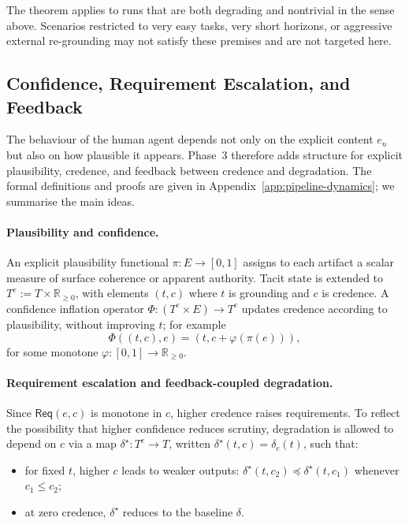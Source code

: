 \documentclass[11pt]{article}
\theoremstyle{definition}
\newcommand{\Req}{\mathsf{Req}}
\begin{document}
The theorem applies to runs that are both degrading and nontrivial in
the sense above. Scenarios restricted to very easy tasks, very short
horizons, or aggressive external re-grounding may not satisfy these
premises and are not targeted here.

\subsection{Confidence, Requirement Escalation, and Feedback}

The behaviour of the human agent depends not only on the explicit
content \(e_n\) but also on how plausible it appears. Phase~3 therefore
adds structure for explicit plausibility, credence, and feedback between
credence and degradation. The formal definitions and proofs are given in
Appendix~\ref{app:pipeline-dynamics}; we summarise the main ideas.

\paragraph{Plausibility and confidence.}
An explicit plausibility functional \(\pi:E\to[0,1]\) assigns to each
artifact a scalar measure of surface coherence or apparent authority.
Tacit state is extended to \(T^e:=T\times\mathbb{R}_{\ge 0}\), with
elements \((t,c)\) where \(t\) is grounding and \(c\) is credence. A
confidence inflation operator
\(\Phi:(T^e\times E)\to T^e\) updates credence according to plausibility,
without improving \(t\); for example
\[
\Phi((t,c),e) = (t,c+\varphi(\pi(e))),
\]
for some monotone \(\varphi:[0,1]\to\mathbb{R}_{\ge 0}\).

\paragraph{Requirement escalation and feedback-coupled degradation.}
Since \(\Req(e,c)\) is monotone in \(c\), higher credence raises
requirements. To reflect the possibility that higher confidence reduces
scrutiny, degradation is allowed to depend on \(c\) via a map
\(\delta^\star:T^e\to T\), written \(\delta^\star(t,c)=\delta_c(t)\),
such that:
\begin{itemize}[leftmargin=2em]
  \item for fixed \(t\), higher \(c\) leads to weaker outputs:
        \(\delta^\star(t,c_2)\preceq \delta^\star(t,c_1)\) whenever
        \(c_1\le c_2\);
  \item at zero credence, \(\delta^\star\) reduces to the baseline
        \(\delta\).
\end{itemize}
\end{document}
